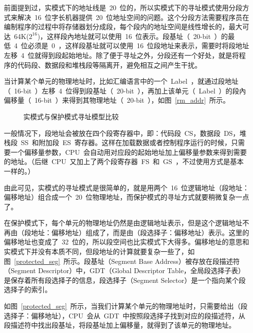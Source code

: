 前面提到过，实模式下的地址线是~20~位的，所以实模式下的寻址模式使用分段方式来解决~16~位字长机器提供~20~位地址空间的问题。这个分段方法需要程序员在编制程序的过程中将存储器划分成段，每个段内的地址空间是线性增长的，最大可达~64K($2^16$)，这样段內地址就可以使用~16~位表示。段基址（~20-bit~）的最低~4~位必须是~0~，这样段基址就可以使用~16~位段地址来表示，需要时将段地址左移~4~位就得到段起始地址。除了便于寻址之外，分段还有一个好处，就是将程序的代码段、数据段和堆栈段等隔离开，避免相互之间产生干扰。

当计算某个单元的物理地址时，比如汇编语言中的一个~Label~，就通过段地址（~16-bit~）左移~4~位得到段基址（~20-bit~），再加上该单元（~Label~）的段內偏移量（~16-bit~）来得到其物理地址（~20-bit~），如图~\ref{rm_addr}~所示。

\begin{figure*}[!t]
\centerline{
\hfil
{}}
\caption{实模式与保护模式寻址模型比较}
\label{real_vs_pro}
\end{figure*}

一般情况下，段地址会被放在四个段寄存器中，即：代码段~CS，数据段~DS，堆栈段~SS~和附加段~ES~寄存器。这样在加载数据或者控制程序运行的时候，只需要一个偏移量参数，CPU~会自动用对应段的起始地址加上偏移量参数来得到需要的地址。（后继~CPU~又加上了两个段寄存器~FS~和~GS~，不过使用方式是基本一样的。）

由此可见，实模式的寻址模式是很简单的，就是用两个~16~位逻辑地址（段地址：偏移地址）组合成一个~20~位物理地址，而保护模式的寻址方式就要稍微复杂一点了。


在保护模式下，每个单元的物理地址仍然是由逻辑地址表示，但是这个逻辑地址不再由（段地址：偏移地址）组成了，而是由（段选择子：偏移地址）表示。这里的偏移地址也变成了~32~位的，所以段空间也比实模式下大得多。偏移地址的意思和实模式下并没有本质不同，但段地址的计算就要复杂一些了，如图~\ref{protected_seg}~所示。段基址（Segment Base Address）被存放在段描述符（Segment Descriptor）中，GDT（Global Descriptor Table，全局段选择子表）是保存着所有段选择子的信息，段选择子（Segment Selector）是一个指向某个段选择子的索引。

如图~\ref{protected_seg}~所示，当我们计算某个单元的物理地址时，只需要给出（段选择子：偏移地址），CPU~会从~GDT~中按照段选择子找到对应的段描述符，从段描述符中找出段基址，将段基址加上偏移量，就得到了该单元的物理地址。

